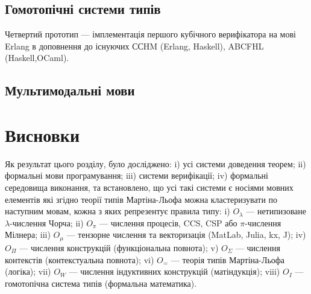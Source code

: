 \subsection{Гомотопічні системи типів}
Четвертий прототип --- імплементація першого кубічного верифікатора на
мові Erlang в доповнення до існуючих ССHM (Erlang, Haskell),
ABCFHL (Haskell,OCaml).

\subsection{Мультимодальні мови}

\section{Висновки}

Як результат цього розділу, було досліджено:
i) усі системи доведення теорем;
ii) формальні мови програмування;
iii) системи верифікації;
iv) формальні середовища виконання,
та встановлено, що усі такі системи є носіями
мовних елементів які згідно теорії типів Мартіна-Льофа можна
кластеризувати по наступним мовам, кожна з яких репрезентує правила типу:
i) $O_\lambda$ --- нетипизоване $\lambda$-числення Чорча;
ii) $O_\pi$ --- числення процесів, CCS, CSP або $\pi$-числення Мілнера;
iii) $O_\mu$ --- тензорне числення та векторизація (MatLab, Julia, kx, J);
iv) $O_\Pi$ --- числення конструкцій (функціональна повнота);
v) $O_\Sigma$ --- числення контекстів (контекстуальна повнота);
vi) $O_=$ --- теорія типів Мартіна-Льофа (логіка);
vii) $O_W$ --- числення індуктивних конструкцій (матіндукція);
viii) $O_I$ --- гомотопічна система типів (формальна математика).

